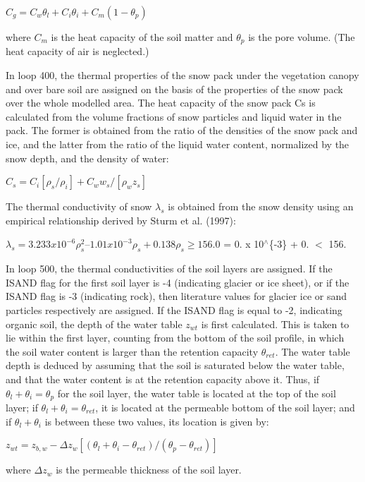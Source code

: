 $C_g = C_w \theta_l + C_i \theta_i + C_m(1 - \theta_p)$

where $C_m$ is the heat capacity of the soil matter and $\theta_p$ is the pore volume. (The heat capacity of air is neglected.)

In loop 400, the thermal properties of the snow pack under the vegetation canopy and over bare soil are assigned on the basis of the properties of the snow pack over the whole modelled area. The heat capacity of the snow pack Cs is calculated from the volume fractions of snow particles and liquid water in the pack. The former is obtained from the ratio of the densities of the snow pack and ice, and the latter from the ratio of the liquid water content, normalized by the snow depth, and the density of water\+:

$C_s = C_i [\rho_s /\rho_i ] + C_w w_s /[\rho_w z_s]$

The thermal conductivity of snow $\lambda_s$ is obtained from the snow density using an empirical relationship derived by Sturm et al. (1997)\+:

$\lambda_s = 3.233 x 10^{-6} \rho_s^2 – 1.01 x 10^{-3} \rho_s + 0.138 \rho_s \geq 156.0 $ = 0. x 10$^\wedge$\{-\/3\}  + 0.  $<$ 156.

In loop 500, the thermal conductivities of the soil layers are assigned. If the I\+S\+A\+N\+D flag for the first soil layer is -\/4 (indicating glacier or ice sheet), or if the I\+S\+A\+N\+D flag is -\/3 (indicating rock), then literature values for glacier ice or sand particles respectively are assigned. If the I\+S\+A\+N\+D flag is equal to -\/2, indicating organic soil, the depth of the water table $z_{wt}$ is first calculated. This is taken to lie within the first layer, counting from the bottom of the soil profile, in which the soil water content is larger than the retention capacity $\theta_{ret}$. The water table depth is deduced by assuming that the soil is saturated below the water table, and that the water content is at the retention capacity above it. Thus, if $\theta_l + \theta_i = \theta_p$ for the soil layer, the water table is located at the top of the soil layer; if $\theta_l + \theta_i = \theta_{ret}$, it is located at the permeable bottom of the soil layer; and if $\theta_l + \theta_i$ is between these two values, its location is given by\+:

$z_{wt} = z_{b,w} - \Delta z_w [(\theta_l + \theta_i - \theta_{ret})/(\theta_p - \theta_{ret})]$

where $\Delta z_w$ is the permeable thickness of the soil layer.

